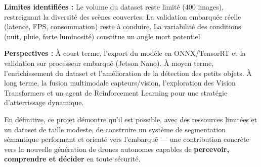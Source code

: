 \vspace{0.6em}
\textbf{Limites identifiées :} Le volume du dataset reste limité (400 images), restreignant la diversité des scènes couvertes. La validation embarquée réelle (latence, FPS, consommation) reste à conduire. La variabilité des conditions (nuit, pluie, forte luminosité) constitue un angle mort potentiel.

\vspace{0.6em}
\textbf{Perspectives :} À court terme, l'export du modèle en ONNX/TensorRT et la validation sur processeur embarqué (Jetson Nano). À moyen terme, l'enrichissement du dataset et l'amélioration de la détection des petits objets. À long terme, la fusion multimodale capteurs/vision, l'exploration des Vision Transformers et un agent de Reinforcement Learning pour une stratégie d'atterrissage dynamique.

\vspace{0.6em}
En définitive, ce projet démontre qu'il est possible, avec des ressources limitées et un dataset de taille modeste, de construire un système de segmentation sémantique performant et orienté vers l'embarqué — une contribution concrète vers la nouvelle génération de drones autonomes capables de \textbf{percevoir, comprendre et décider} en toute sécurité.

\clearpage
